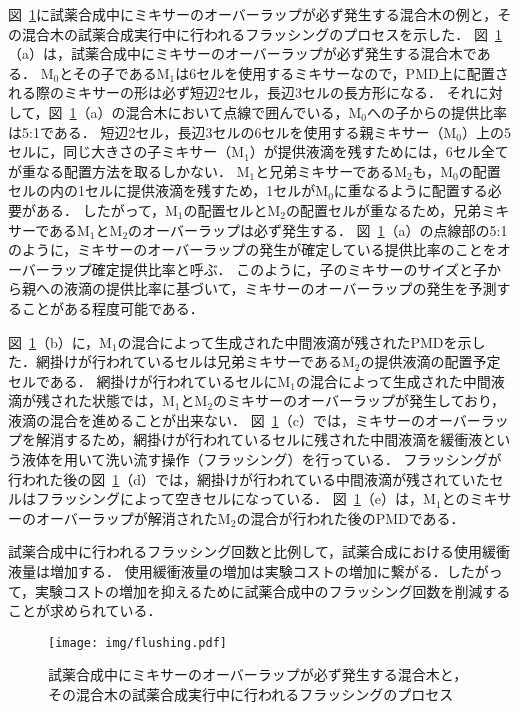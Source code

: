     図~\ref{fig:flushing}に試薬合成中にミキサーのオーバーラップが必ず発生する混合木の例と，その混合木の試薬合成実行中に行われるフラッシングのプロセスを示した．
    図~\ref{fig:flushing}（a）は，試薬合成中にミキサーのオーバーラップが必ず発生する混合木である．
    M$_0$とその子であるM$_1$は6セルを使用するミキサーなので，PMD上に配置される際のミキサーの形は必ず短辺2セル，長辺3セルの長方形になる．
    それに対して，図~\ref{fig:flushing}（a）の混合木において点線で囲んでいる，M$_0$への子からの提供比率は5:1である．
    短辺2セル，長辺3セルの6セルを使用する親ミキサー（M$_0$）上の5セルに，同じ大きさの子ミキサー（M$_1$）が提供液滴を残すためには，6セル全てが重なる配置方法を取るしかない．
    M$_1$と兄弟ミキサーであるM$_2$も，M$_0$の配置セルの内の1セルに提供液滴を残すため，1セルがM$_0$に重なるように配置する必要がある．
    したがって，M$_1$の配置セルとM$_2$の配置セルが重なるため，兄弟ミキサーであるM$_1$とM$_2$のオーバーラップは必ず発生する．
    図~\ref{fig:flushing}（a）の点線部の5:1のように，ミキサーのオーバーラップの発生が確定している提供比率のことをオーバーラップ確定提供比率と呼ぶ．
    このように，子のミキサーのサイズと子から親への液滴の提供比率に基づいて，ミキサーのオーバーラップの発生を予測することがある程度可能である．
    
    図~\ref{fig:flushing}（b）に，M$_1$の混合によって生成された中間液滴が残されたPMDを示した．網掛けが行われているセルは兄弟ミキサーであるM$_2$の提供液滴の配置予定セルである．
    網掛けが行われているセルにM$_1$の混合によって生成された中間液滴が残された状態では，M$_1$とM$_2$のミキサーのオーバーラップが発生しており，液滴の混合を進めることが出来ない．
    図~\ref{fig:flushing}（c）では，ミキサーのオーバーラップを解消するため，網掛けが行われているセルに残された中間液滴を緩衝液という液体を用いて洗い流す操作（フラッシング）を行っている．
    フラッシングが行われた後の図~\ref{fig:flushing}（d）では，網掛けが行われている中間液滴が残されていたセルはフラッシングによって空きセルになっている．
    図~\ref{fig:flushing}（e）は，M$_1$とのミキサーのオーバーラップが解消されたM$_2$の混合が行われた後のPMDである．

    試薬合成中に行われるフラッシング回数と比例して，試薬合成における使用緩衝液量は増加する．
    使用緩衝液量の増加は実験コストの増加に繋がる．したがって，実験コストの増加を抑えるために試薬合成中のフラッシング回数を削減することが求められている．


 \begin{figure}[tbp]
    \centering\texttt{[image: img/flushing.pdf]}
    \caption{試薬合成中にミキサーのオーバーラップが必ず発生する混合木と，その混合木の試薬合成実行中に行われるフラッシングのプロセス}\label{fig:flushing}
    
\end{figure}

